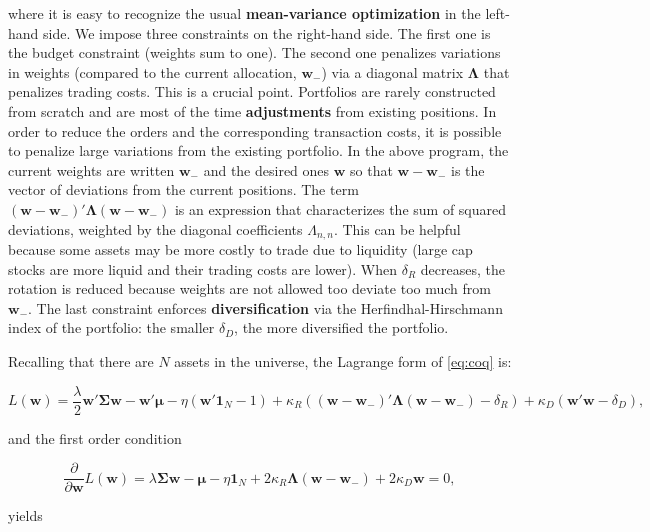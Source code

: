 where it is easy to recognize the usual \textbf{mean-variance optimization} in the left-hand side. We impose three constraints on the right-hand side. The first one is the budget constraint (weights sum to one). The second one penalizes variations in weights (compared to the current allocation, $\textbf{w}_ -$) via a diagonal matrix $\boldsymbol{\Lambda}$ that penalizes trading costs. This is a crucial point. Portfolios are rarely constructed from scratch and are most of the time \textbf{adjustments} from existing positions. In order to reduce the orders and the corresponding transaction costs, it is possible to penalize large variations from the existing portfolio. In the above program, the current weights are written $\textbf{w}_ -$ and the desired ones $\textbf{w}$ so that $\textbf{w} -\textbf{w}_ -$ is the vector of deviations from the current positions. The term $(\textbf{w} -\textbf{w}_ -)'\boldsymbol{\Lambda}(\textbf{w} -\textbf{w}_ -)$ is an expression that characterizes the sum of squared deviations, weighted by the diagonal coefficients $\Lambda_{n,n}$. This can be helpful because some assets may be more costly to trade due to liquidity (large cap stocks are more liquid and their trading costs are lower). When $\delta_R$ decreases, the rotation is reduced because weights are not allowed too deviate too much from $\textbf{w}_ -$. The last constraint enforces \textbf{diversification} via the Herfindhal-Hirschmann index of the portfolio: the smaller $\delta_D$, the more diversified the portfolio.

Recalling that there are $N$ assets in the universe, the Lagrange form of \ref{eq:coq} is:

\begin{equation}
\label{eq:lagrangew}
L(\textbf{w})= \frac{\lambda}{2} \textbf{w}'\boldsymbol{\Sigma}\textbf{w}-\textbf{w}'\boldsymbol{\mu}-\eta (\textbf{w}'\textbf{1}_N-1)+\kappa_R ( (\textbf{w}-\textbf{w}_-)'\boldsymbol{\Lambda}(\textbf{w}-\textbf{w}_-) - \delta_R)+\kappa_D(\textbf{w}'\textbf{w}-\delta_D),
\end{equation}

and the first order condition

\begin{equation}
\frac{\partial}{\partial \textbf{w}}L(\textbf{w})= \lambda \boldsymbol{\Sigma}\textbf{w}-\boldsymbol{\mu}-\eta\textbf{1}_N+2\kappa_R \boldsymbol{\Lambda}(\textbf{w}-\textbf{w}_-)+2\kappa_D\textbf{w}=0,
\end{equation}

yields

